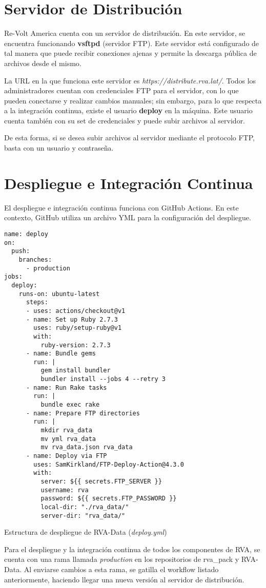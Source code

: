 \newpage

\section{Servidor de Distribución}
Re-Volt America cuenta con un servidor de distribución. En este servidor, se encuentra funcionando \textbf{vsftpd} (servidor FTP). Este servidor está configurado de tal manera que puede recibir conexiones ajenas y permite la descarga pública de archivos desde el mismo.

La URL en la que funciona este servidor es \textit{https://distribute.rva.lat/}. Todos los administradores cuentan con credenciales FTP para el servidor, con lo que pueden conectarse y realizar cambios manuales; sin embargo, para lo que respecta a la integración continua, existe el usuario \textbf{deploy} en la máquina. Este usuario cuenta también con su set de credenciales y puede subir archivos al servidor.

De esta forma, si se desea subir archivos al servidor mediante el protocolo FTP, basta con un usuario y contraseña.

\newpage

\section{Despliegue e Integración Continua}
El despliegue e integración continua funciona con GitHub Actions. En este contexto, GitHub utiliza un archivo YML para la configuración del despliegue.

\begin{longlisting}
  \begin{verbatim}  
name: deploy
on:
  push:
    branches:
      - production
jobs:
  deploy:
    runs-on: ubuntu-latest
      steps:
      - uses: actions/checkout@v1
      - name: Set up Ruby 2.7.3
        uses: ruby/setup-ruby@v1
        with:
          ruby-version: 2.7.3
      - name: Bundle gems
        run: |
          gem install bundler
          bundler install --jobs 4 --retry 3
      - name: Run Rake tasks
        run: |
          bundle exec rake
      - name: Prepare FTP directories
        run: |
          mkdir rva_data
          mv yml rva_data
          mv rva_data.json rva_data
      - name: Deploy via FTP
        uses: SamKirkland/FTP-Deploy-Action@4.3.0
        with:
          server: ${{ secrets.FTP_SERVER }}
          username: rva
          password: ${{ secrets.FTP_PASSWORD }}
          local-dir: "./rva_data/"
          server-dir: "rva_data/"
  \end{verbatim}
  \caption[Workflow de Despleigue]{Estructura de despliegue de RVA-Data (\textit{deploy.yml})}
\end{longlisting}

\newpage

Para el despliegue y la integración continua de todos los componentes de RVA, se cuenta con una rama llamada \textit{production} en los repositorios de rva\_pack y RVA-Data. Al enviarse cambios a esta rama, se gatilla el workflow listado anteriormente, haciendo llegar una nueva versión al servidor de distribución.